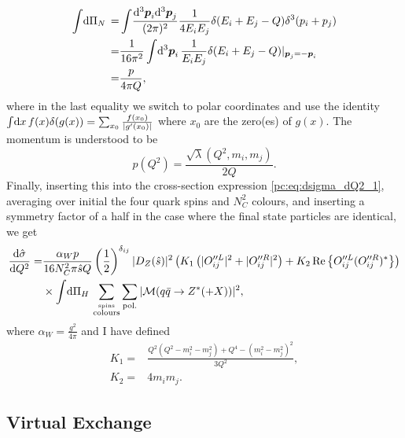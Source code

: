 \documentclass[../main.tex]{subfiles}
\begin{document}
\begin{align}
  \int \!\mathrm{d}\Pi_N\, = & \int\! \frac{\mathrm{d}^3\boldsymbol{p}_i \mathrm{d}^3\boldsymbol{p}_j}{(2\pi)^2} \frac{1}{4E_i E_j} \delta(E_i+E_j-Q) \delta^3(p_i+p_j) \\
  =                  & \frac{1}{16\pi^2} \int \!\mathrm{d}^3\boldsymbol{p}_i\, \frac{1}{E_i E_j} \delta(E_i + E_j - Q)|_{\boldsymbol{p}_j = -\boldsymbol{p}_i}                 \\
  =                  & \frac{p}{4\pi Q},
\end{align}
where in the last equality we switch to polar coordinates and use the identity \(\int \!\mathrm{d}x\, f(x) \delta(g(x)) = \sum_{x_0} \frac{f(x_0)}{|g^\prime(x_0)|}\) where \(x_0\) are the zero(es) of \(g(x)\).
The momentum is understood to be
\begin{equation}
  p(Q^2) = \frac{\sqrt{\lambda}(Q^2, m_i, m_j)}{2Q}.
\end{equation}
Finally, inserting this into the cross-section expression \cref{pc:eq:dsigma_dQ2_1}, averaging over initial the four quark spins and \(N_C^2\) colours, and inserting a symmetry factor of a half in the case where the final state particles are identical, we get
\begin{align}
  \label{pc:eq:dsigma_dQ2_2}
  \nonumber
  \d[Q^2]{\hat\sigma} = & \frac{\alpha_W p}{16 N_C^2 \pi \hat{s} Q} \pclosed{\frac{1}{2}}^{\delta_{ij}} |D_Z(\hat{s})|^2 \pclosed{K_1\pclosed{|O_{ij}^{\prime\prime L}|^2+|O_{ij}^{\prime\prime R}|^2} + K_2 \Re{O_{ij}^{\prime\prime L} (O_{ij}^{\prime\prime R})^\ast}} \\
                        & \times \integral{\Pi_H} \sum_{\stackrel{\text{spins}}{\text{colours}}} \sum_\text{pol.}|\M(q\bar{q} \to Z^\ast (+ X))|^2,
\end{align}
where \(\alpha_W = \frac{g^2}{4\pi}\) and I have defined
\begin{subequations}
  \begin{align}
    K_1 = & \frac{Q^2(Q^2-m_i^2-m_j^2) + Q^4 - (m_i^2-m_j^2)^2}{3Q^2}, \\
    K_2 = & 4m_i m_j.
  \end{align}
\end{subequations}


\subsection{Virtual Exchange}
\end{document}
